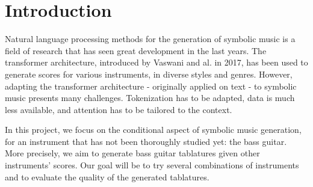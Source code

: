 \documentclass[11pt, a4paper]{article}
\begin{document}






\newpage

\section*{Introduction}

Natural language processing methods for the generation of symbolic music is a field of research that has seen great development in the last years.
The transformer architecture, introduced by Vaswani and al. in 2017, has been used to generate scores for various instruments, in diverse styles and genres\cite{vaswaniAttentionAllYou2023, leNaturalLanguageProcessing2024}.
However, adapting the transformer architecture - originally applied on text - to symbolic music presents many challenges.
Tokenization has to be adapted, data is much less available, and attention has to be tailored to the context\cite{leNaturalLanguageProcessing2024}.





In this project, we focus on the conditional aspect of symbolic music generation, for an instrument that has not been thoroughly studied yet: the bass guitar.
More precisely, we aim to generate bass guitar tablatures given other instruments' scores. Our goal will be to try several combinations of instruments and to evaluate the quality of the generated tablatures.
\end{document}
